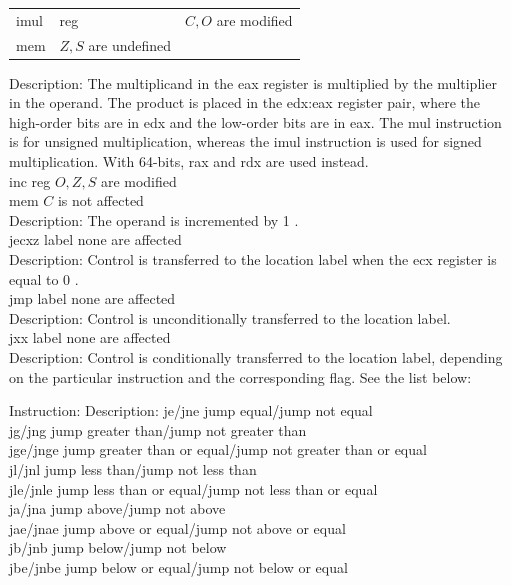 \documentclass[10pt]{book}
\begin{document}
\begin{center}
\begin{tabular}{lll}
imul & reg & $C, O$ are modified \\
mem & $Z, S$ are undefined &  \\
\end{tabular}
\end{center}

Description: The multiplicand in the eax register is multiplied by the multiplier in the operand. The product is placed in the edx:eax register pair, where the high-order bits are in edx and the low-order bits are in eax. The mul instruction is for unsigned multiplication, whereas the imul instruction is used for signed multiplication. With 64-bits, rax and rdx are used instead.\\
inc reg $O, Z, S$ are modified\\
mem $C$ is not affected\\
Description: The operand is incremented by 1 .\\
jecxz label none are affected\\
Description: Control is transferred to the location label when the ecx register is equal to 0 .\\
jmp label none are affected\\
Description: Control is unconditionally transferred to the location label.\\
jxx label none are affected\\
Description: Control is conditionally transferred to the location label, depending on the particular instruction and the corresponding flag. See the list below:

Instruction: Description:
je/jne jump equal/jump not equal\\
jg/jng jump greater than/jump not greater than\\
jge/jnge jump greater than or equal/jump not greater than or equal\\
jl/jnl jump less than/jump not less than\\
jle/jnle jump less than or equal/jump not less than or equal\\
ja/jna jump above/jump not above\\
jae/jnae jump above or equal/jump not above or equal\\
jb/jnb jump below/jump not below\\
jbe/jnbe jump below or equal/jump not below or equal
\end{document}

